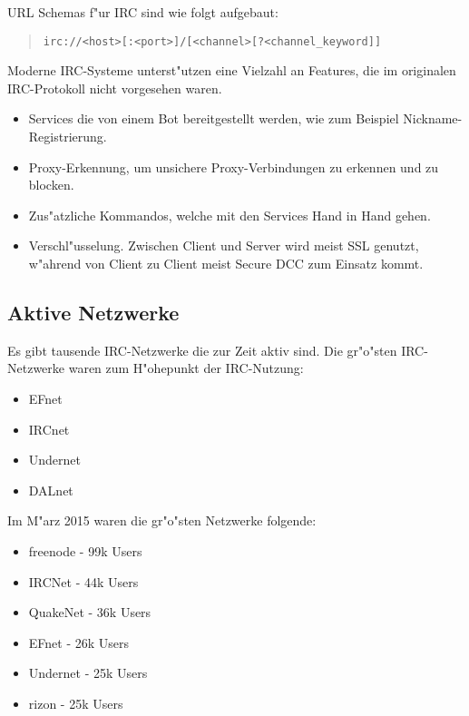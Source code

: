 URL Schemas f"ur IRC sind wie folgt aufgebaut:
\begin{quote}
\verb|irc://<host>[:<port>]/[<channel>[?<channel_keyword]]|
\end{quote}
Moderne IRC-Systeme unterst"utzen eine Vielzahl an Features, die im originalen IRC-Protokoll nicht vorgesehen waren.
\begin{itemize}
\item Services die von einem Bot bereitgestellt werden, wie zum Beispiel Nickname-Registrierung.
\item Proxy-Erkennung, um unsichere Proxy-Verbindungen zu erkennen und zu blocken.
\item Zus"atzliche Kommandos, welche mit den Services Hand in Hand gehen.
\item Verschl"usselung. Zwischen Client und Server wird meist SSL genutzt, w"ahrend von Client zu Client meist Secure DCC zum Einsatz kommt.
\end{itemize}
\subsection{Aktive Netzwerke}
Es gibt tausende IRC-Netzwerke die zur Zeit aktiv sind. Die gr"o"sten IRC-Netzwerke waren zum H"ohepunkt der IRC-Nutzung:
\begin{itemize}
\item EFnet
\item IRCnet
\item Undernet
\item DALnet
\end{itemize}
Im M"arz 2015 waren die gr"o"sten Netzwerke folgende:
\begin{itemize}
\item freenode - 99k Users
\item IRCNet - 44k Users
\item QuakeNet - 36k Users
\item EFnet - 26k Users
\item Undernet - 25k Users
\item rizon - 25k Users
\end{itemize}

